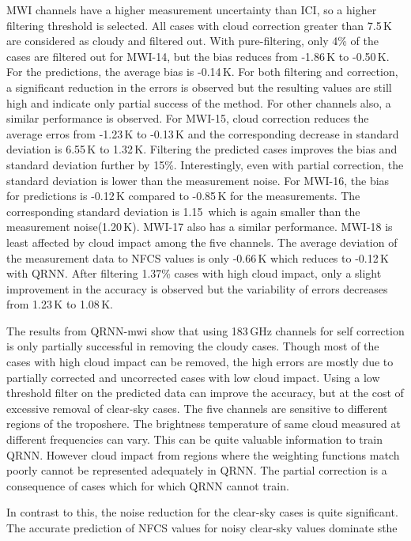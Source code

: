 \documentclass[amt, manuscript]{copernicus}
\begin{document}
MWI channels have a higher measurement uncertainty than ICI, so a higher filtering threshold is selected. All cases with cloud correction greater than 7.5\,K are considered as cloudy and filtered out. With pure-filtering, only 4\% of the cases are filtered out for MWI-14, but the bias reduces from -1.86\,K to -0.50\,K. For the predictions, the average bias is -0.14\,K. For both filtering and correction, a significant reduction in the errors is observed but the resulting values are still high and indicate only partial success of the method. For other channels also, a similar performance is observed.  For MWI-15, cloud correction reduces the average erros from -1.23\,K to -0.13\,K  and the corresponding decrease in standard deviation is 6.55\,K to 1.32\,K. Filtering the predicted cases improves the bias and standard deviation further by 15\%. Interestingly, even with partial correction, the standard deviation is lower than the measurement noise. For MWI-16, the bias for predictions is -0.12\,K compared to -0.85\,K for the measurements. The corresponding standard deviation is  1.15\, which is again smaller than the measurement noise(1.20\,K). MWI-17 also has a similar performance. MWI-18 is least affected by cloud impact among the five channels. The average deviation of the measurement data to NFCS values is only -0.66\,K which reduces to -0.12\,K with QRNN. After filtering 1.37\% cases with high cloud impact, only a slight improvement in the accuracy is observed but the variability of errors decreases from 1.23\,K to 1.08\,K. 



The results from QRNN-mwi show that using 183\,GHz channels for self correction is only partially successful in removing the cloudy cases. Though most of the cases with high cloud impact can be removed, the high errors are mostly due to partially corrected and uncorrected cases with low cloud impact. Using a low threshold filter on the predicted data can improve the accuracy, but at the cost of excessive removal of clear-sky cases. The five channels are sensitive to different regions of the troposhere. The brightness temperature of same cloud measured at different frequencies can vary. This can be quite valuable information to train QRNN. However cloud impact from regions where the weighting functions match poorly cannot be represented adequately in QRNN. The partial correction is a consequence of cases which for which QRNN cannot train. 

In contrast to this, the noise reduction for the clear-sky cases is quite significant. The accurate prediction of NFCS values for noisy clear-sky values dominate sthe 
\end{document}
